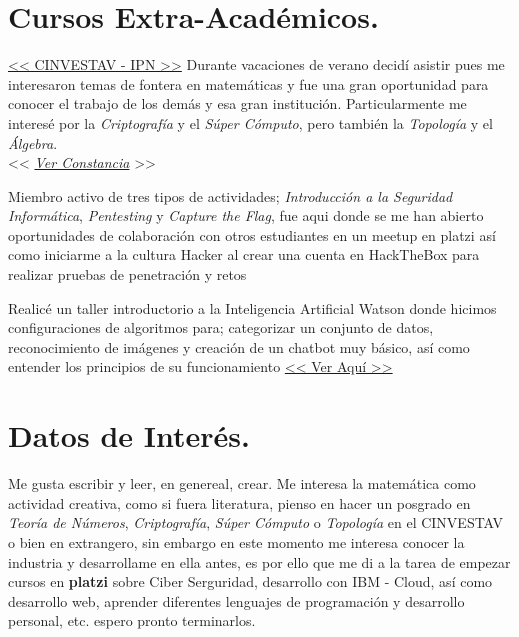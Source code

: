 \documentclass[]{friggeri-cv}
\begin{document}
\section{Cursos Extra-Académicos.}
\begin{entrylist}
 
  
  {\href{https://www.math.cinvestav.mx}{<< CINVESTAV - IPN >>}}
  {
  Durante vacaciones de verano decidí asistir pues me interesaron temas de fontera en matemáticas y fue una gran oportunidad para conocer el trabajo de los demás y esa gran institución. Particularmente me interesé por la \textit{Criptografía} y el \textit{Súper Cómputo}, pero también la \textit{Topología} y el \textit{Álgebra}.\\
   << \href{https://drive.google.com/file/d/0BxsBj4oBVw3fMlVjQXlfOGl3VHhYUm15RlRlQXVHMHE1Nm9Z/view?usp=sharing}{\textit{Ver Constancia}} >>
  }
  
  {
  Miembro activo de tres tipos de actividades; \textit{Introducción a la Seguridad Informática}, \textit{Pentesting} y \textit{Capture the Flag}, fue aqui donde se me han abierto oportunidades de colaboración con otros estudiantes en un meetup en platzi así como iniciarme a la cultura Hacker al crear una cuenta en HackTheBox para realizar pruebas de penetración y retos}
  
  {
  Realicé un taller introductorio a la Inteligencia Artificial Watson donde hicimos configuraciones de algoritmos  para; categorizar un conjunto de datos, reconocimiento de imágenes y creación de un chatbot muy básico, así como entender los principios de su funcionamiento  \href{https://drive.google.com/file/d/1HZNd6Rm6PFyitDFkMpKJaU-E61z-BiQa/view?usp=sharing}{ << Ver Aquí >>}
  }
  
  
\end{entrylist}

\section{Datos de Interés.}
Me gusta escribir y leer, en genereal, crear. Me interesa la matemática como actividad creativa, como si fuera literatura, pienso en hacer un posgrado en \textit{Teoría de Números}, \textit{Criptografía}, \textit{Súper Cómputo} o \textit{Topología} en el CINVESTAV o bien en extrangero, sin embargo en este momento me interesa conocer la industria y desarrollame en ella antes, es por ello que me di a la tarea de empezar cursos en \textbf{platzi} sobre Ciber Serguridad, desarrollo con IBM - Cloud, así como desarrollo web, aprender diferentes lenguajes de programación y desarrollo personal, etc. espero pronto terminarlos.
\end{document}
